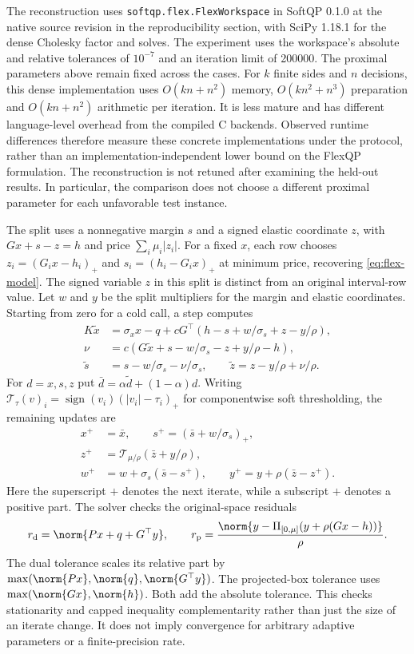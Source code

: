 The reconstruction uses \texttt{softqp.flex.FlexWorkspace} in SoftQP 0.1.0
at the native source revision in the reproducibility section, with SciPy
1.18.1 for the dense Cholesky factor and solves. The experiment uses the workspace's absolute and relative tolerances of $10^{-7}$
and an iteration limit of 200000. The proximal parameters above remain
fixed across the cases. For $k$ finite sides and $n$ decisions, this dense
implementation uses $O(kn+n^2)$ memory, $O(kn^2+n^3)$ preparation and
$O(kn+n^2)$ arithmetic per iteration.
It is less mature and has different language-level overhead from the compiled
C backends. Observed runtime differences therefore measure these concrete
implementations under the protocol, rather than an implementation-independent
lower bound on the FlexQP formulation. The reconstruction is not retuned after
examining the held-out results. In particular, the comparison does not choose a
different proximal parameter for each unfavorable test instance.

The split uses a nonnegative margin $s$ and a signed elastic coordinate
$z$, with $Gx+s-z=h$ and price $\sum_i\mu_i|z_i|$. For a fixed $x$, each
row chooses $z_i=(G_i x-h_i)_+$ and $s_i=(h_i-G_i x)_+$ at minimum
price, recovering \eqref{eq:flex-model}. The signed variable $z$ in this
split is distinct from an original interval-row value.
Let $w$ and $y$ be the split multipliers for the margin and elastic
coordinates. Starting from zero for a cold call, a step computes
\begin{align}\label{eq:flex-graph}
 K\widetilde x&=\sigma_x x-q+
   cG^\top(h-s+w/\sigma_s+z-y/\rho),\\
 \nu&=c(G\widetilde x+s-w/\sigma_s-z+y/\rho-h),\nonumber\\
 \widetilde s&=s-w/\sigma_s-\nu/\sigma_s,\qquad
 \widetilde z=z-y/\rho+\nu/\rho.\nonumber
\end{align}
For $d=x,s,z$ put $\bar d=\alpha\widetilde d+(1-\alpha)d$.
Writing $\mathcal T_{\tau}(v)_i=\operatorname{sign}(v_i)
(|v_i|-\tau_i)_+$ for componentwise soft thresholding, the remaining
updates are
\begin{align}\label{eq:flex-project}
 x^+&=\bar x,\qquad s^+=(\bar s+w/\sigma_s)_+,\\
 z^+&=\mathcal T_{\mu/\rho}(\bar z+y/\rho),\nonumber\\
 w^+&=w+\sigma_s(\bar s-s^+),\qquad
 y^+=y+\rho(\bar z-z^+).\nonumber
\end{align}
Here the superscript $+$ denotes the next iterate, while a subscript $+$
denotes a positive part. The solver checks the original-space residuals
\begin{equation}\label{eq:flex-stop}
 r_{\rm d}=\norm{Px+q+G^\top y},\qquad
 r_{\rm p}=\frac{\norm{y-\Pi_{[0,\mu]}(y+\rho(Gx-h))}}{\rho}.
\end{equation}
The dual tolerance scales its relative part by
$\max(\norm{Px},\norm{q},\norm{G^\top y})$. The projected-box tolerance
uses $\max(\norm{Gx},\norm{h})$. Both add the absolute tolerance.
This checks stationarity and capped inequality complementarity rather
than just the size of an iterate change. It does not imply convergence
for arbitrary adaptive parameters or a finite-precision rate.

